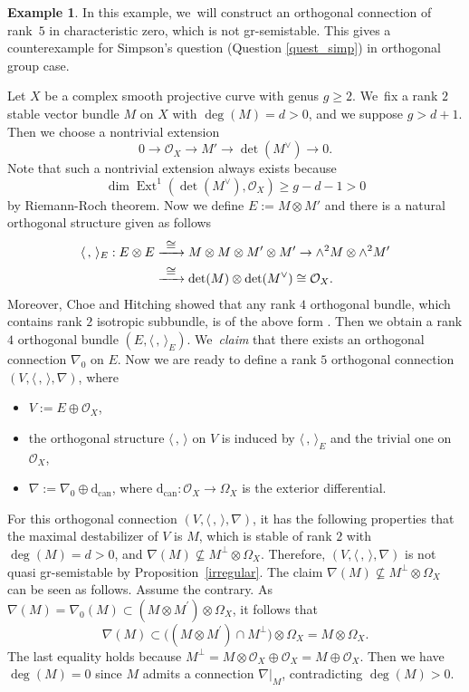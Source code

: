 \documentclass[11pt]{article}
\numberwithin{equation}{section}
\newcommand\To[1]{\mathchoice{\xrightarrow{\textstyle\kern4pt#1\kern3pt}}{\stackrel{#1}{\to}}{}{}}
\newcommand{\grsemistable}{gr\nobreakdash-semi\-stable\xspace}
\DeclareMathOperator{\Ext}{Ext}
\theoremstyle{plain}
\theoremstyle{definition}
\newtheorem{examp}[thm]{Example}
\begin{document}
\begin{examp}\label{exmp_char_zero}
In this example, we~will construct an orthogonal connection of rank~$5$ in characteristic zero, which is not \grsemistable. This gives a counterexample for Simpson's question (Question \ref{quest_simp}) in orthogonal group case.

Let $X$ be a complex smooth projective curve with genus $g \geq 2$. We~fix a rank $2$ stable vector bundle $M$ on $X$ with $\deg(M)=d>0$, and we suppose $g > d+1$. Then we choose a nontrivial extension
\[
0 \to \mathcal{O}_X \to M' \to \det(M^{\vee}) \to 0.
\]
Note that such a nontrivial extension always exists because
\[
\dim \Ext^1(\det(M^{\vee}), \mathcal{O}_X ) \geq g-d-1 > 0
\]
by Riemann-Roch theorem. Now we define $E := M \otimes M'$ and there is a natural orthogonal structure given as follows
\begin{align*}
\langle \,, \, \rangle_E : E \otimes E & \To{\cong} M \otimes M \otimes M' \otimes M' \to \wedge^2 M \otimes \wedge^2 M' \\
& \To{\cong} \det(M) \otimes \det(M^{\vee}) \cong \mathcal{O}_X.
\end{align*}
Moreover, Choe and Hitching showed that any rank $4$ orthogonal bundle, which contains rank $2$ isotropic subbundle, is of the above form \cite[Th.\,4.2]{CH23}. Then we obtain a rank $4$ orthogonal bundle $(E, \langle \,, \, \rangle_E)$. We~\emph{claim} that there exists an orthogonal connection $\nabla_0$ on $E$. Now we are ready to define a rank $5$ orthogonal connection $(V, \langle \,, \, \rangle, \nabla)$, where
\begin{itemize}
\item $V:= E \oplus \mathcal{O}_X$,
\item the orthogonal structure $\langle \,, \, \rangle$ on $V$ is induced by $\langle \,, \, \rangle_E$ and the trivial one on $\mathcal{O}_X$,
\item $\nabla:=\nabla_0 \oplus \mathrm{d}_\mathrm{can}$, where $\mathrm{d}_\mathrm{can}: \mathcal{O}_X \to \Omega_X$ is the exterior differential.
\end{itemize}
For this orthogonal connection $(V, \langle \,, \, \rangle, \nabla)$, it has the following properties that the maximal destabilizer of $V$ is $M$, which is stable of rank $2$ with $\deg (M) =d > 0$, and $\nabla(M) \nsubseteq M^{\perp} \otimes \Omega_X$. Therefore, $(V, \langle \,, \, \rangle, \nabla)$ is not quasi \grsemistable by Proposition~\ref{irregular}. The claim $\nabla(M) \nsubseteq M^{\perp} \otimes \Omega_X$ can be seen as follows. Assume the contrary. As~$\nabla(M)=\nabla_0(M)\subset (M\otimes M^\prime)\otimes \Omega_X$, it follows that
\[
\nabla(M)\subset \big((M\otimes M^\prime)\cap M^{\perp}\big)\otimes \Omega_X=M\otimes \Omega_X.
\]
The last equality holds because $M^{\perp}=M\otimes \mathcal{O}_X\oplus \mathcal{O}_X=M\oplus \mathcal{O}_X$. Then we have $\deg(M)=0$ since $M$ admits a connection $\nabla|_{M}$, contradicting $\deg(M)>0$.


\end{examp}
\end{document}
